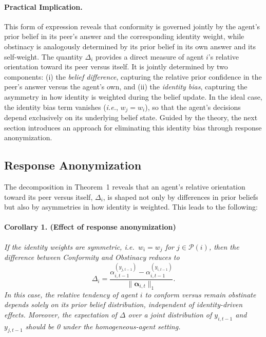 \documentclass{article}
\begin{document}
\paragraph{Practical Implication.} This form of expression reveals that conformity is governed jointly by the agent’s prior belief in its peer’s answer and the corresponding identity weight, while obstinacy is analogously determined by its prior belief in its own answer and its self-weight.
The quantity $\Delta_{i}$ provides a direct measure of agent $i$’s relative orientation toward its peer versus itself. 
It is jointly determined by two components: (i) the \textit{belief difference}, capturing the relative prior confidence in the peer’s answer versus the agent’s own, and (ii) the \textit{identity bias}, capturing the asymmetry in how identity is weighted during the belief update.
In the ideal case, the identity bias term vanishes (\textit{i.e.}, $w_j = w_i$), so that the agent’s decisions depend exclusively on its underlying belief state.
Guided by the theory, the next section introduces an approach for eliminating this identity bias through response anonymization.




\subsection{Response Anonymization}
\label{sec:anonymization}

The decomposition in Theorem~1 reveals that an agent’s relative orientation toward its peer versus itself, $\Delta_{i}$, is shaped not only by differences in prior beliefs but also by asymmetries in how identity is weighted. 
This leads to the following:

\paragraph{Corollary 1. (Effect of response anonymization)}
\textit{If the identity weights are symmetric, i.e.\ $w_i = w_j$ for $j \in \mathcal{P}(i)$, then the difference between Conformity and Obstinacy reduces to
\[
\Delta_i = \frac{\alpha_{i,t-1}^{(y_{j,t-1})} - \alpha_{i,t-1}^{(y_{i,t-1})}}{\|\boldsymbol{\alpha}_{i,t}\|_1}.
\]
In this case, the relative tendency of agent $i$ to conform versus remain obstinate depends {solely on its prior belief distribution, independent of identity-driven effects}. Moreover, the expectation of $\Delta$ over a joint distribution of $y_{i,t-1}$ and $y_{j,t-1}$ should be 0 under the homogeneous-agent setting.
}
\vspace{2mm}
\end{document}
